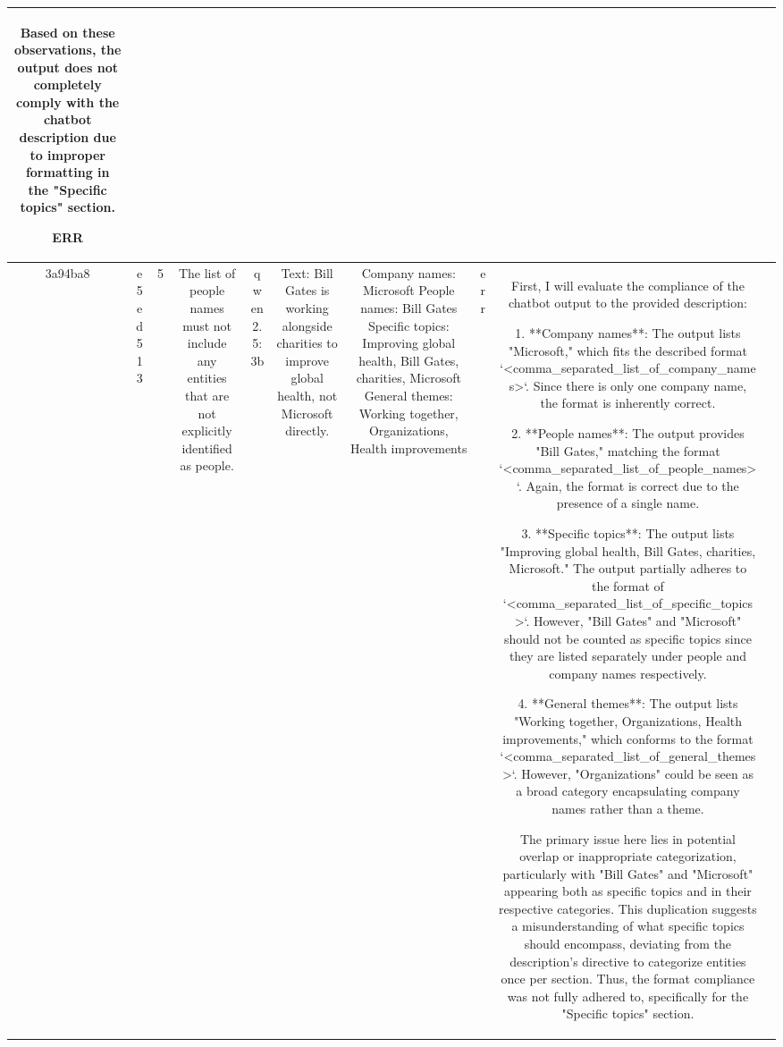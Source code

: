 \begin{table}[h!]
\begin{tabular}{|c|c|c|c|c|c|c|c|c|c|}
Based on these observations, the output does not completely comply with the chatbot description due to improper formatting in the "Specific topics" section. 

ERR & \\
\hline
3a94ba8 & e5ed513 & 5 & The list of people names must not include any entities that are not explicitly identified as people. & qwen2.5:3b & Text: Bill Gates is working alongside charities to improve global health, not Microsoft directly. & Company names: Microsoft
People names: Bill Gates
Specific topics: Improving global health, Bill Gates, charities, Microsoft
General themes: Working together, Organizations, Health improvements & err & First, I will evaluate the compliance of the chatbot output to the provided description:

1. **Company names**: The output lists "Microsoft," which fits the described format `<comma_separated_list_of_company_names>`. Since there is only one company name, the format is inherently correct.

2. **People names**: The output provides "Bill Gates," matching the format `<comma_separated_list_of_people_names>`. Again, the format is correct due to the presence of a single name.

3. **Specific topics**: The output lists "Improving global health, Bill Gates, charities, Microsoft." The output partially adheres to the format of `<comma_separated_list_of_specific_topics>`. However, "Bill Gates" and "Microsoft" should not be counted as specific topics since they are listed separately under people and company names respectively.

4. **General themes**: The output lists "Working together, Organizations, Health improvements," which conforms to the format `<comma_separated_list_of_general_themes>`. However, "Organizations" could be seen as a broad category encapsulating company names rather than a theme.

The primary issue here lies in potential overlap or inappropriate categorization, particularly with "Bill Gates" and "Microsoft" appearing both as specific topics and in their respective categories. This duplication suggests a misunderstanding of what specific topics should encompass, deviating from the description's directive to categorize entities once per section. Thus, the format compliance was not fully adhered to, specifically for the "Specific topics" section.


\end{tabular}
\end{table}

